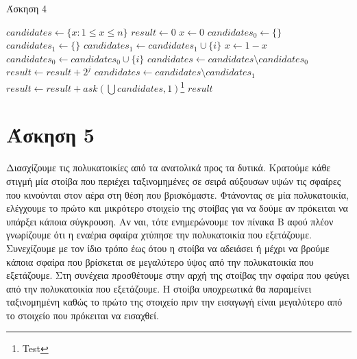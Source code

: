 \documentclass[11pt,a4paper]{book}
\begin{document}
\begin{algorithm}[H]
\caption{\textgreek{Άσκηση 4}}
\begin{algorithmic}[1]
    \State $candidates \gets \{ x: 1 \leq x \leq n \}$
    \State $result \gets 0$
        \State $x \gets 0$
        \State $candidates_0 \gets \{\}$
        \State $candidates_1 \gets \{\}$
                \State $candidates_1 \gets candidates_1 \cup \{ i \}$
                \State $x \gets 1 - x$
            \Else
                \State $candidates_0 \gets candidates_0 \cup \{ i \}$
            \EndIf
        \EndFor
            \State $candidates \gets candidates \setminus candidates_0$
            \State $result \gets result + 2 ^ j$
        \Else
            \State $candidates \gets candidates \setminus candidates_1$
        \EndIf
    \EndFor
    \State $result \gets result + ask( \bigcup candidates, 1 )$\footnote{Test}
    \State \Return $result$
\EndProcedure
\end{algorithmic}
\end{algorithm}

\section*{Άσκηση 5}
Διασχίζουμε τις πολυκατοικίες από τα ανατολικά προς τα δυτικά. Κρατούμε κάθε στιγμή μία στοίβα που περιέχει ταξινομημένες σε σειρά αύξουσων υψών τις σφαίρες που κινούνται στον αέρα στη θέση που βρισκόμαστε. Φτάνοντας σε μία πολυκατοικία, ελέγχουμε το πρώτο και μικρότερο στοιχείο της στοίβας για να δούμε αν πρόκειται να υπάρξει κάποια σύγκρουση. Αν ναι, τότε ενημερώνουμε τον πίνακα Β αφού πλέον γνωρίζουμε ότι η εναέρια σφαίρα χτύπησε την πολυκατοικία που εξετάζουμε. Συνεχίζουμε με τον ίδιο τρόπο έως ότου η στοίβα να αδειάσει ή μέχρι να βρούμε κάποια σφαίρα που βρίσκεται σε μεγαλύτερο ύψος από την πολυκατοικία που εξετάζουμε. Στη συνέχεια προσθέτουμε στην αρχή της στοίβας την σφαίρα που φεύγει από την πολυκατοικία που εξετάζουμε. Η στοίβα υποχρεωτικά θα παραμείνει ταξινομημένη καθώς το πρώτο της στοιχείο πριν την εισαγωγή είναι μεγαλύτερο από το στοιχείο που πρόκειται να εισαχθεί.
\end{document}
